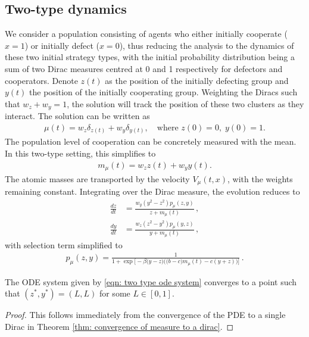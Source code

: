 \documentclass[10pt]{article}
\begin{document}
\subsection{Two-type dynamics}\label{sec: two type dynamics}
We consider a population consisting of agents who either initially cooperate ($x=1$) or initially defect ($x=0$), thus reducing the analysis to the dynamics of these two initial strategy types, with the initial probability distribution being a sum of two Dirac measures centred at 0 and 1 respectively for defectors and cooperators. Denote $z(t)$ as the position of the initially defecting group and $y(t)$ the position of the initially cooperating group. Weighting the Diracs such that $w_z + w_y = 1$, the solution will track the position of these two clusters as they interact. The solution can be written as 
\begin{align*}
    \mu(t) = w_z \delta_{z(t)} + w_y\delta_{y(t)},\quad\text{where  } z(0) = 0,\; y(0) = 1.
\end{align*}
The population level of cooperation can be concretely measured with the mean. In this two-type setting, this simplifies to
\begin{align*}
    m_\mu(t) = w_zz(t) + w_yy(t).
\end{align*}
The atomic masses are transported by the velocity $V_\mu(t,x)$, with the weights remaining constant. Integrating over the Dirac measure, the evolution reduces to
\begin{subequations}\label{eqn: two type ode system}
\begin{align}
    \frac{dz}{dt} &=\frac{w_y(y^2-z^2)p_\mu(z,y)}{z+ m_\mu(t)} \,, \label{eqn: two type ode dz/dt}\\
     \frac{dy}{dt} &=\frac{w_z(z^2-y^2)p_\mu(y,z) }{y+ m_\mu(t)} \,, \label{eqn: two type ode dy/dt}
\end{align}
\end{subequations}
with selection term simplified to
\begin{align*}
    p_\mu(z,y) = \frac{1}{1 + \exp\big[-\beta\big(y-z\big)\Big(\big(b-c)m_{\mu}(t)-c(y+z)\Big)\big]} \,.
\end{align*}
\begin{corollary}\label{corollary: ode limit point}
    The ODE system given by \eqref{eqn: two type ode system} converges to a point such that $(z^*,y^*)=(L,L)$ for some $L \in [0,1]$.
\end{corollary}
\begin{proof}
    This follows immediately from the convergence of the PDE to a single Dirac in Theorem \ref{thm: convergence of measure to a dirac}.
\end{proof}
\end{document}
